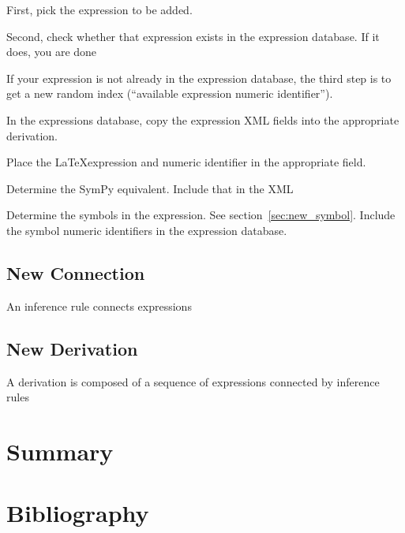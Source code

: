 \documentclass{article}
\begin{document}
\begin{multicols}{2}
First, pick the expression to be added.

Second, check whether that expression exists in the expression database. If it does, you are done

If your expression is not already in the expression database, the third step is to get a new random index (``available expression numeric identifier''). 

In the expressions database, copy the expression XML fields into the appropriate derivation. 

Place the \LaTeX expression and numeric identifier in the appropriate field. 

Determine the SymPy equivalent. Include that in the XML

Determine the symbols in the expression. See section~\ref{sec:new_symbol}. Include the symbol numeric identifiers in the expression database.

\subsection{New Connection\label{sec:new_connection}}

An inference rule connects expressions

\subsection{New Derivation\label{sec:how_derivation}}

A derivation is composed of a sequence of expressions connected by inference rules

\section{Summary}

\section{Bibliography}


\end{multicols}

\newpage
\appendix
%
\end{document}
